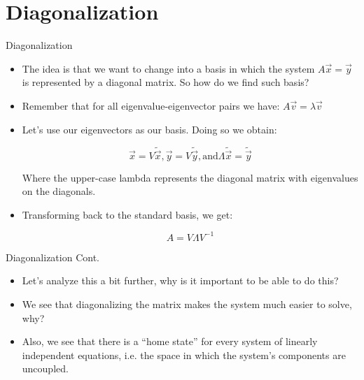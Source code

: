 \section{Diagonalization}

\begin{frame}{Diagonalization}
	    \begin{itemize}
	        \item The idea is that we want to change into a basis in which the system $A\vec{x} = \vec{y}$ is represented by a diagonal matrix. So how do we find such basis?
	        
	        \item Remember that for all eigenvalue-eigenvector pairs we have: $A\vec{v} = \lambda\vec{v}$
	        
	        \item Let’s use our eigenvectors as our basis. Doing so we obtain:
	        
	        $$\vec{x} = V\tilde{\vec{x}}, \vec{y} = V\tilde{\vec{y}}, \text{and} \Lambda\tilde{\vec{x}} = \tilde{\vec{y}}$$
	        
	        Where the upper-case lambda represents the diagonal matrix with eigenvalues on the diagonals.
	        
	        \item Transforming back to the standard basis, we get:
            
            $$A = V\Lambda{V^{-1}}$$
	    \end{itemize}
	\end{frame}
	
	\begin{frame}{Diagonalization Cont.}
	    \begin{itemize}
	        \item Let’s analyze this a bit further, why is it important to be able to do this?
            
            \item We see that diagonalizing the matrix makes the system much easier to solve, why? 
            
            \item Also, we see that there is a “home state” for every system of linearly independent equations, i.e. the space in which the system’s components are uncoupled.
	    \end{itemize}
	\end{frame}
	
